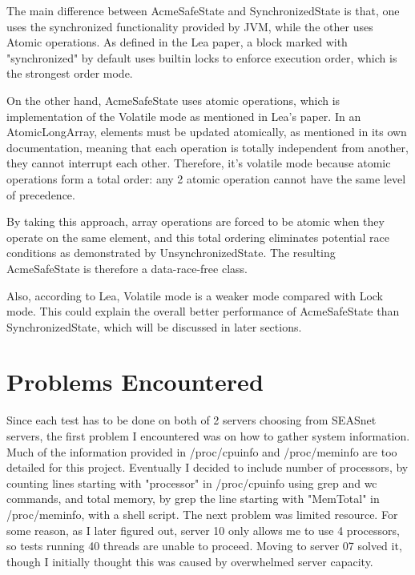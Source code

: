 The main difference between AcmeSafeState and SynchronizedState is that, one uses the synchronized functionality provided by JVM, while the other uses Atomic operations.
As defined in the Lea paper, a block marked with "synchronized" by default uses builtin locks to enforce execution order, which is the strongest order mode. 

On the other hand, AcmeSafeState uses atomic operations, which is implementation of the Volatile mode as mentioned in Lea's paper. 
In an AtomicLongArray, elements must be updated atomically, as mentioned in its own documentation, meaning that each operation is totally independent from another, they cannot interrupt each other.
Therefore, it's volatile mode because atomic operations form a total order: any 2 atomic operation cannot have the same level of precedence. 

By taking this approach, array operations are forced to be atomic when they operate on the same element, and this total ordering eliminates potential race conditions as demonstrated by UnsynchronizedState. 
The resulting AcmeSafeState is therefore a data-race-free class.

Also, according to Lea, Volatile mode is a weaker mode compared with Lock mode. 
This could explain the overall better performance of AcmeSafeState than SynchronizedState, which will be discussed in later sections.

\section{Problems Encountered}

Since each test has to be done on both of 2 servers choosing from SEASnet servers, the first problem I encountered was on how to gather system information.
Much of the information provided in /proc/cpuinfo and /proc/meminfo are too detailed for this project. 
Eventually I decided to include number of processors, by counting lines starting with "processor" in /proc/cpuinfo using grep and wc commands, 
and total memory, by grep the line starting with "MemTotal" in /proc/meminfo, with a shell script.
The next problem was limited resource. For some reason, as I later figured out, server 10 only allows me to use 4 processors, so tests running 40 threads are unable to proceed.
Moving to server 07 solved it, though I initially thought this was caused by overwhelmed server capacity.


